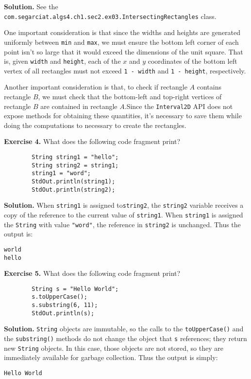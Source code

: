 \documentclass[12pt, a4paper]{article}
\newenvironment{ex}[2][Exercise]
{\par\medskip\noindent \textbf{#1 #2.}}
{\medskip}
\newenvironment{sol}[1][Solution]
{\par\medskip\noindent \textbf{#1.} }
{\medskip}
\begin{document}
	\begin{sol}
		See the \texttt{com.segarciat.algs4.ch1.sec2.ex03.IntersectingRectangles} class.
		
		One important consideration is that since the widths and heights are generated uniformly
		between \texttt{min} and \texttt{max}, we must ensure the bottom left corner of each
		point isn't so large that it would exceed the  dimensions of the unit square.
		That is, given \texttt{width} and \texttt{height}, each of the $x$ and $y$
		coordinates of the bottom left vertex of all rectangles must not exceed
		\texttt{1 - width} and \texttt{1 - height}, respectively.
		
		Another important consideration is that, to check if rectangle $A$ contains rectangle $B$,
		we must check that the bottom-left and top-right vertices of rectangle $B$ are contained in
		rectangle $A$.Since the \texttt{Interval2D} API does not expose methods for obtaining these
		quantities, it's necessary to save them while doing the computations to necessary to create
		the rectangles.
	\end{sol}
	\begin{ex}{4}
		What does the following code fragment print?
		\begin{lstlisting}
		String string1 = "hello";
		String string2 = string1;
		string1 = "word";
		StdOut.println(string1);
		StdOut.println(string2);
		\end{lstlisting}
	\end{ex}
	\begin{sol}
		When \texttt{string1} is assigned to\texttt{string2}, the \texttt{string2} variable
		receives a copy of the reference to the current value of \texttt{string1}.
		When \texttt{string1} is assigned the \texttt{String} with value \texttt{"word"},
		the reference in \texttt{string2} is unchanged. Thus the output is:
		\begin{lstlisting}[language={}]
world
hello
		\end{lstlisting}
	\end{sol}
	\begin{ex}{5}
		What does the following code fragment print?
		\begin{lstlisting}
		String s = "Hello World";
		s.toUpperCase();
		s.substring(6, 11);
		StdOut.println(s);
		\end{lstlisting}
	\end{ex}
	\begin{sol}
		\texttt{String} objects are immutable, so the calls to the  \texttt{toUpperCase()}
		and the \texttt{substring()} methods do not change the object that \texttt{s}
		references; they return new \texttt{String} objects. In this case, those objects
		are not stored, so they are immediately available for garbage collection. Thus the
		output is simply:
		\begin{lstlisting}[language={}]
Hello World
		\end{lstlisting}
	\end{sol}
\end{document}
